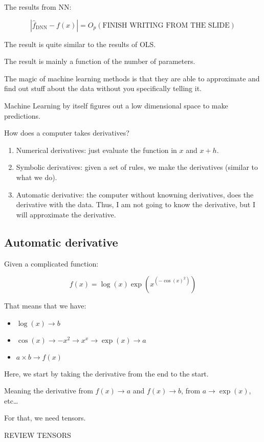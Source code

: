 \documentclass{article}
\begin{document}
The results from NN:

$$
\left| \hat{f}_{\text{DNN}} - f(x) \right| = O_p (\text{FINISH WRITING FROM THE SLIDE})
$$

The result is quite similar to the results of OLS.

The result is mainly a function of the number of parameters.

The magic of machine learning methods is that they are able to approximate and find out stuff about the data without you specifically telling it.

Machine Learning by itself figures out a low dimensional space to make predictions.

How does a computer takes derivatives?
\begin{enumerate}
    \item Numerical derivatives: just evaluate the function in $x$ and $x + h$.
    \item Symbolic derivatives: given a set of rules, we make the derivatives (similar to what we do).
    \item Automatic derivative: the computer without knowning derivatives, does the derivative with the data. Thus, I am not going to know the derivative, but I will approximate the derivative.
\end{enumerate}

\subsection{Automatic derivative}

Given a complicated function:

$$
f(x) = \log(x) \exp \left(x^{\left( -\cos(x)^2 \right)} \right)
$$

That means that we have:

\begin{itemize}
    \item $\log(x) \to b$
    \item $\cos(x) \to -x^2 \to x^x \to \exp(x) \to a$
    \item $a \times b \to f(x)$
\end{itemize}

Here, we start by taking the derivative from the end to the start.

Meaning the derivative from $f(x) \to a$ and $f(x) \to b$, from $a \to \exp(x)$, etc\dots

For that, we need tensors.

REVIEW TENSORS
\end{document}
